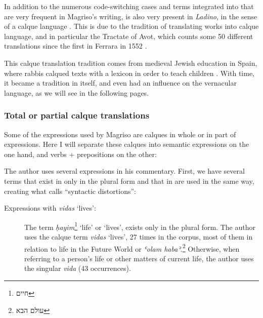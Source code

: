 \documentclass[output=paper,colorlinks,citecolor=brown,babel,arabicfont]{langscibook}
\begin{document}
In addition to the numerous code-switching cases and  terms integrated into  that are very frequent in Magriso's writing,  is also very present in \textit{Ladino}, in the sense of a calque language \citep[45, 49]{sephiha1973}. This is due to the  tradition of translating  works into calque language, and in particular the Tractate of Avot, which counts some 50 different translations since the first in Ferrara in 1552 \citep[139]{schwarzwald_rodrigue1985}.

This calque translation tradition comes from medieval Jewish education in Spain, where rabbis calqued  texts with a  lexicon in order to teach children . With time, it became a tradition in itself, and even had an influence on the vernacular language, as we will see in the following pages.

\subsubsection{Total or partial calque translations}\label{ch3.7.ss.3.3.1}

Some of the expressions used by Magriso are calques in whole or in part of  expressions. Here I will separate these calques into semantic expressions on the one hand, and verbs + prepositions on the other:

\label{ch3.7.ss.3.3.1.1}

The author uses several  expressions in his commentary. First, we have several terms that exist in  only in the plural form and that in  are used in the same way, creating what \citet[66]{sephiha1973} calls ``syntactic distortions'':

\begin{description}

\item[Expressions with \textit{vidas} `lives':]
The  term \textit{ḥayim}\footnote{\texthebrew{חיים}} `life' or `lives', exists only in the plural form. The author uses the calque term \textit{vidas} `lives', 27 times in the corpus, most of them in relation to life in the Future World or \textit{ʿolam habaʾ}.\footnote{\texthebrew{עולם הבא}} Otherwise, when referring to a person's life or other matters of current life, the author uses the singular  \textit{vida} (43 occurrences). 
\end{description}
\end{document}
